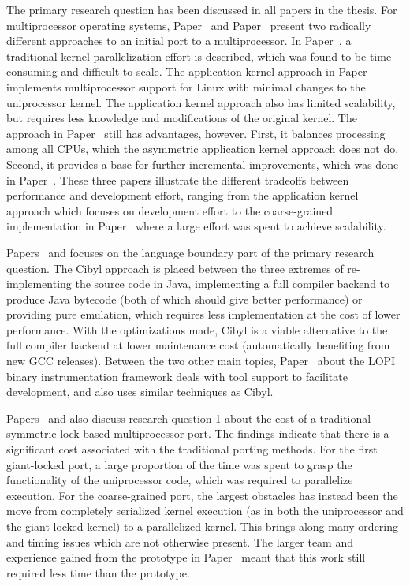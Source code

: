 The primary research question has been discussed in all papers in the thesis.
For multiprocessor operating systems, Paper~ and
Paper~ present two radically different approaches to
an initial port to a multiprocessor. In Paper~, a
traditional kernel parallelization effort is described, which was found to be
time consuming and difficult to scale. The application kernel approach in
Paper~ implements multiprocessor support for Linux
with minimal changes to the uniprocessor kernel. The application kernel
approach also has limited scalability, but requires less knowledge and
modifications of the original kernel. The approach in
Paper~ still has advantages, however. First, it
balances processing among all CPUs, which the asymmetric application kernel
approach does not do. Second, it provides a base for further incremental
improvements, which was done in Paper~. These three
papers illustrate the different tradeoffs between performance and development
effort, ranging from the application kernel approach which focuses on
development effort to the coarse-grained implementation in
Paper~ where a large effort was spent to achieve
scalability.

Papers~ and  focuses on the
language boundary part of the primary research question. The Cibyl approach is
placed between the three extremes of re-implementing the source code in Java,
implementing a full compiler backend to produce Java bytecode (both of which
should give better performance) or providing pure emulation, which requires
less implementation at the cost of lower performance. With the optimizations
made, Cibyl is a viable alternative to the full compiler backend at lower
maintenance cost (automatically benefiting from new GCC releases). Between the
two other main topics, Paper~ about the LOPI binary
instrumentation framework deals with tool support to facilitate development,
and also uses similar techniques as Cibyl.

Papers~ and  also discuss
research question 1 about the cost of a traditional symmetric lock-based
multiprocessor port. The findings indicate that there is a significant cost
associated with the traditional porting methods. For the first giant-locked
port, a large proportion of the time was spent to grasp the functionality of
the uniprocessor code, which was required to parallelize execution. For the
coarse-grained port, the largest obstacles has instead been the move from
completely serialized kernel execution (as in both the uniprocessor and the
giant locked kernel) to a parallelized kernel. This brings along many ordering
and timing issues which are not otherwise present. The larger team and
experience gained from the prototype in Paper~ meant
that this work still required less time than the prototype.

